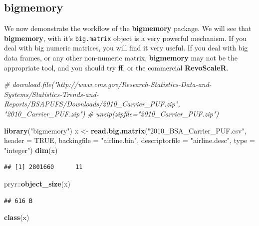 \documentclass[]{book}
\newenvironment{Shaded}{\begin{snugshade}}{\end{snugshade}}
\newcommand{\KeywordTok}[1]{\textcolor[rgb]{0.13,0.29,0.53}{\textbf{{#1}}}}
\newcommand{\DataTypeTok}[1]{\textcolor[rgb]{0.13,0.29,0.53}{{#1}}}
\newcommand{\StringTok}[1]{\textcolor[rgb]{0.31,0.60,0.02}{{#1}}}
\newcommand{\CommentTok}[1]{\textcolor[rgb]{0.56,0.35,0.01}{\textit{{#1}}}}
\newcommand{\OtherTok}[1]{\textcolor[rgb]{0.56,0.35,0.01}{{#1}}}
\newcommand{\NormalTok}[1]{{#1}}
\theoremstyle{definition}
\theoremstyle{definition}
\theoremstyle{remark}
\begin{document}
\subsection{bigmemory}\label{bigmemory}

We now demonstrate the workflow of the \textbf{bigmemory} package. We
will see that \textbf{bigmemory}, with it's \texttt{big.matrix} object
is a very powerful mechanism. If you deal with big numeric matrices, you
will find it very useful. If you deal with big data frames, or any other
non-numeric matrix, \textbf{bigmemory} may not be the appropriate tool,
and you should try \textbf{ff}, or the commercial \textbf{RevoScaleR}.

\begin{Shaded}
\begin{Highlighting}[]
\CommentTok{# download.file("http://www.cms.gov/Research-Statistics-Data-and-Systems/Statistics-Trends-and-Reports/BSAPUFS/Downloads/2010_Carrier_PUF.zip", "2010_Carrier_PUF.zip")}
\CommentTok{# unzip(zipfile="2010_Carrier_PUF.zip")}

\KeywordTok{library}\NormalTok{(}\StringTok{"bigmemory"}\NormalTok{)}
\NormalTok{x <-}\StringTok{ }\KeywordTok{read.big.matrix}\NormalTok{(}\StringTok{"2010_BSA_Carrier_PUF.csv"}\NormalTok{, }\DataTypeTok{header =} \OtherTok{TRUE}\NormalTok{, }
                     \DataTypeTok{backingfile =} \StringTok{"airline.bin"}\NormalTok{, }
                     \DataTypeTok{descriptorfile =} \StringTok{"airline.desc"}\NormalTok{, }
                     \DataTypeTok{type =} \StringTok{"integer"}\NormalTok{)}
\KeywordTok{dim}\NormalTok{(x)}
\end{Highlighting}
\end{Shaded}

\begin{verbatim}
## [1] 2801660      11
\end{verbatim}

\begin{Shaded}
\begin{Highlighting}[]
\NormalTok{pryr::}\KeywordTok{object_size}\NormalTok{(x)}
\end{Highlighting}
\end{Shaded}

\begin{verbatim}
## 616 B
\end{verbatim}

\begin{Shaded}
\begin{Highlighting}[]
\KeywordTok{class}\NormalTok{(x)}
\end{Highlighting}
\end{Shaded}
\end{document}
